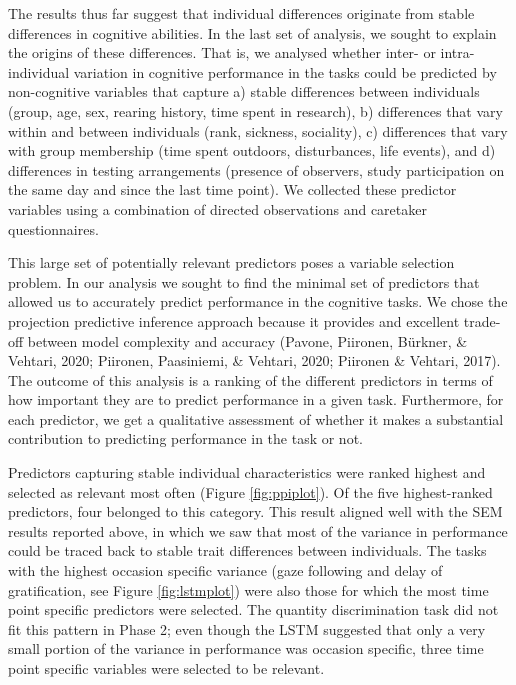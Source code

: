\documentclass[
  man,floatsintext]{apa6}
\begin{document}
The results thus far suggest that individual differences originate from stable differences in cognitive abilities. In the last set of analysis, we sought to explain the origins of these differences. That is, we analysed whether inter- or intra-individual variation in cognitive performance in the tasks could be predicted by non-cognitive variables that capture a) stable differences between individuals (group, age, sex, rearing history, time spent in research), b) differences that vary within and between individuals (rank, sickness, sociality), c) differences that vary with group membership (time spent outdoors, disturbances, life events), and d) differences in testing arrangements (presence of observers, study participation on the same day and since the last time point). We collected these predictor variables using a combination of directed observations and caretaker questionnaires.

This large set of potentially relevant predictors poses a variable selection problem. In our analysis we sought to find the minimal set of predictors that allowed us to accurately predict performance in the cognitive tasks. We chose the projection predictive inference approach because it provides and excellent trade-off between model complexity and accuracy (Pavone, Piironen, Bürkner, \& Vehtari, 2020; Piironen, Paasiniemi, \& Vehtari, 2020; Piironen \& Vehtari, 2017). The outcome of this analysis is a ranking of the different predictors in terms of how important they are to predict performance in a given task. Furthermore, for each predictor, we get a qualitative assessment of whether it makes a substantial contribution to predicting performance in the task or not.

Predictors capturing stable individual characteristics were ranked highest and selected as relevant most often (Figure \ref{fig:ppiplot}). Of the five highest-ranked predictors, four belonged to this category. This result aligned well with the SEM results reported above, in which we saw that most of the variance in performance could be traced back to stable trait differences between individuals. The tasks with the highest occasion specific variance (gaze following and delay of gratification, see Figure \ref{fig:lstmplot}) were also those for which the most time point specific predictors were selected. The quantity discrimination task did not fit this pattern in Phase 2; even though the LSTM suggested that only a very small portion of the variance in performance was occasion specific, three time point specific variables were selected to be relevant.
\end{document}
